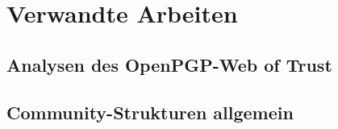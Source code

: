 \section{Verwandte Arbeiten}
\label{ch:Grundlagen:sec:RelatedWork}

\subsection{Analysen des OpenPGP-Web of Trust}
\label{ch:Grundlagen:sec:RelatedWork:subsec:wot-analysis}

\subsection{Community-Strukturen allgemein}
\label{ch:Grundlagen:sec:RelatedWork:subsec:community-analysis}


